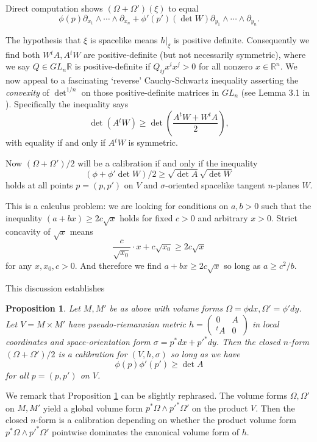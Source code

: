 \documentclass[12pt]{amsart}
\newtheorem{prop}[thm]{Proposition}
\theoremstyle{definition}
\theoremstyle{remark}
\newcommand{\bR}{\mathbb{R}}
\newcommand{\bZ}{\mathbb{Z}}
\newcommand{\del}{\partial}
\begin{document}
Direct computation shows $(\Omega+\Omega')(\xi)$ to equal $$\phi(p) \del_{x_1}\wedge \cdots \wedge \del_{x_n}+ \phi'(p')(\det W) \del_{y_1}\wedge \cdots \wedge \del_{y_n}.$$

The hypothesis that $\xi$ is spacelike means $h|_{\xi}$ is positive definite. Consequently we find both $W{}^tA, A{}^tW$ are positive-definite (but not necessarily symmetric), where we say $Q\in GL_n \bR$ is positive-definite if $Q_{ij}x^ix^j>0$ for all nonzero $x\in \bR^{n}$. We now appeal to a fascinating `reverse' Cauchy-Schwartz inequality asserting the \emph{convexity} of $\det^{1/n}$ on those positive-definite matrices in $GL_n$ (see Lemma 3.1 in \cite{W}). Specifically the inequality says $$\det(A{}^tW)\geq \det(\frac{A{}^t W + W{}^t A}{2}),$$ with equality if and only if $A{}^t W$ is symmetric.  

Now $(\Omega+\Omega')/2$ will be a calibration if and only if the inequality $$(\phi+\phi' \det W)/2 \geq \sqrt{\det A} \sqrt{\det W}$$ holds at all points $p=(p,p')$ on $V$ and $\sigma$-oriented spacelike tangent $n$-planes $W$. 

This is a calculus problem: we are looking for conditions on $a,b>0$ such that the inequality $(a+bx) \geq 2c \sqrt{x}$ holds for fixed $c>0$ and arbitrary $x>0$. Strict concavity of $\sqrt{x}$ means $$\frac{c}{\sqrt{x_0}} \cdot x + c \sqrt{x_0} \geq 2c \sqrt{x}$$ for any $x,x_0,c>0$. And therefore we find $a+bx \geq 2c \sqrt{x}$ so long as $a \geq c^2/b$.  

This discussion establishes
\begin{prop}\label{cal2} Let $M,M'$ be as above with volume forms $\Omega=\phi dx, \Omega'=\phi'dy$. Let $V=M \times M'$ have pseudo-riemannian metric $h=\begin{pmatrix} 0&A \\ {}^tA & 0\end{pmatrix}$ in local coordinates and space-orientation form $\sigma=p^*dx+p'^*dy$. Then the closed $n$-form $(\Omega+\Omega')/2$ is a calibration for $(V,h,\sigma)$ so long as we have $$ \phi(p) \phi'(p') \geq \det A$$ for all $p=(p,p')$ on $V$.
\end{prop}

We remark that Proposition \ref{cal2} can be slightly rephrased. The volume forms $\Omega, \Omega'$ on $M,M'$ yield a global volume form $p^*\Omega \wedge p'^* \Omega'$ on the product $V$. Then the closed $n$-form is a calibration depending on whether the product volume form $p^*\Omega \wedge p'^* \Omega'$ pointwise dominates the canonical volume form of $h$. 











\end{document}
